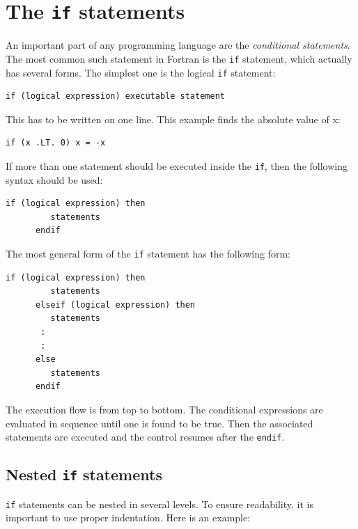 \chapter{The \texttt{if} statements}

An important part of any programming language are the \emph{conditional statements}. The most common such statement in Fortran is the \texttt{if} statement, which actually has several forms. The simplest one is the logical \texttt{if} statement:

\begin{lstlisting}[style=fortran77]
      if (logical expression) executable statement
\end{lstlisting}

This has to be written on one line. This example finds the absolute value of x:

\begin{lstlisting}[style=fortran77]
      if (x .LT. 0) x = -x
\end{lstlisting}

If more than one statement should be executed inside the \texttt{if}, then the following syntax should be used:

\begin{lstlisting}[style=fortran77]
      if (logical expression) then
         statements
      endif
\end{lstlisting}

The most general form of the \texttt{if} statement has the following form:

\begin{lstlisting}[style=fortran77]
      if (logical expression) then
         statements
      elseif (logical expression) then
         statements
       :
       :
      else
         statements
      endif
\end{lstlisting}

The execution flow is from top to bottom. The conditional expressions are evaluated in sequence until one is found to be true. Then the associated statements are executed and the control resumes after the \texttt{endif}.

\section{Nested \texttt{if} statements}

\texttt{if} statements can be nested in several levels. To ensure readability, it is important to use proper indentation. Here is an example:

